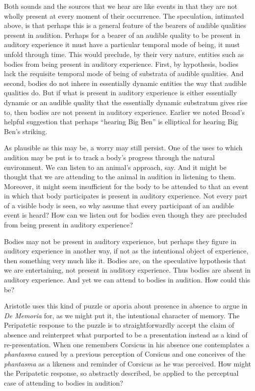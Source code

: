 \documentclass[12pt]{article}
\begin{document}
Both sounds and the sources that we hear are like events in that they are not wholly present at every moment of their occurrence. The speculation, intimated above, is that perhaps this is a general feature of the bearers of audible qualities present in audition. Perhaps for a bearer of an audible quality to be present in auditory experience it must have a particular temporal mode of being, it must unfold through time. This would preclude, by their very nature, entities such as bodies from being present in auditory experience. First, by hypothesis, bodies lack the requisite temporal mode of being of substrata of audible qualities. And second, bodies do not inhere in essentially dynamic entities the way that audible qualities do. But if what is present in auditory experience is either essentially dynamic or an audible quality that the essentially dynamic substratum gives rise to, then bodies are not present in auditory experience. Earlier we noted Broad’s helpful suggestion that perhaps “hearing Big Ben” is elliptical for hearing Big Ben’s striking.

As plausible as this may be, a worry may still persist. One of the uses to which audition may be put is to track a body’s progress through the natural environment. We can listen to an animal’s approach, say. And it might be thought that we are attending to the animal in audition in listening to them. Moreover, it might seem insufficient for the body to be attended to that an event in which that body participates is present in auditory experience. Not every part of a visible body is seen, so why assume that every participant of an audible event is heard? How can we listen out for bodies even though they are precluded from being present in auditory experience?

Bodies may not be present in auditory experience, but perhaps they figure in auditory experience in another way, if not as the intentional object of experience, then something very much like it. Bodies are, on the speculative hypothesis that we are entertaining, not present in auditory experience. Thus bodies are absent in auditory experience. And yet we can attend to bodies in audition. How could this be?

Aristotle uses this kind of puzzle or aporia about presence in absence to argue in \emph{De Memoria} for, as we might put it, the intentional character of memory. The Peripatetic response to the puzzle is to straightforwardly accept the claim of absence and reinterpret what purported to be a presentation instead as a kind of re-presentation. When one remembers Corsicus in his absence one contemplates a \emph{phantasma} caused by a previous perception of Corsicus and one conceives of the \emph{phantasma} as a likeness and reminder of Corsicus as he was perceived. How might the Peripatetic response, so abstractly described, be applied to the perceptual case of attending to bodies in audition?
\end{document}
